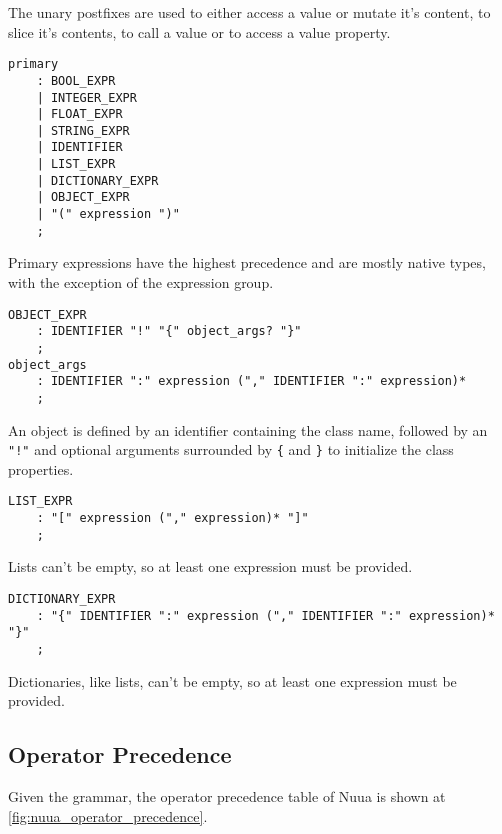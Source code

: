 The unary postfixes are used to either access a value or mutate it's content, to slice it's contents, to call a value or to access a value property.

\begin{lstlisting}
primary
    : BOOL_EXPR
    | INTEGER_EXPR
    | FLOAT_EXPR
    | STRING_EXPR
    | IDENTIFIER
    | LIST_EXPR
    | DICTIONARY_EXPR
    | OBJECT_EXPR
    | "(" expression ")"
    ;
\end{lstlisting}

Primary expressions have the highest precedence and are mostly native types, with the exception of the expression group.

\clearpage

\begin{lstlisting}
OBJECT_EXPR
    : IDENTIFIER "!" "{" object_args? "}"
    ;
object_args
    : IDENTIFIER ":" expression ("," IDENTIFIER ":" expression)*
    ;
\end{lstlisting}

An object is defined by an identifier containing the class name, followed by an \texttt{"!"} and optional arguments surrounded by \texttt{\{} and \texttt{\}} to
initialize the class properties.

\begin{lstlisting}
LIST_EXPR
    : "[" expression ("," expression)* "]"
    ;
\end{lstlisting}

Lists can't be empty, so at least one expression must be provided.

\begin{lstlisting}
DICTIONARY_EXPR
    : "{" IDENTIFIER ":" expression ("," IDENTIFIER ":" expression)* "}"
    ;
\end{lstlisting}

Dictionaries, like lists, can't be empty, so at least one expression must be provided.
\clearpage
\subsection{Operator Precedence}

Given the grammar, the operator precedence table of Nuua is shown at \autoref{fig:nuua_operator_precedence}.

